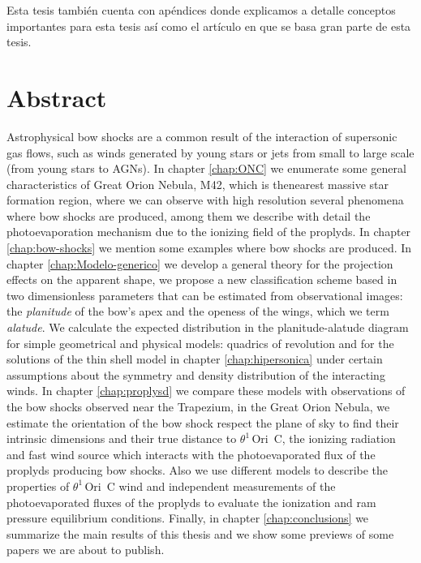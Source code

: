 \documentclass[11pt, twoside]{book}
\newcommand\thC{\(\theta^1\)\,Ori~C} %
\begin{document}
Esta tesis también cuenta con apéndices donde explicamos a detalle conceptos importantes para esta tesis así como el artículo en que se basa gran parte de esta tesis.

\section*{\centering Abstract}

  Astrophysical bow shocks are a common result of the interaction of supersonic gas flows, such as winds generated by young stars or jets from small to large scale (from young stars to AGNs). In chapter \ref{chap:ONC} we enumerate some general characteristics of Great Orion Nebula, M42, which is thenearest massive star formation region, where we can observe with high resolution several phenomena where bow shocks are produced, among them we describe with detail the photoevaporation mechanism due to the ionizing field of the proplyds. In chapter \ref{chap:bow-shocks} we mention some examples where bow shocks are produced. In chapter \ref{chap:Modelo-generico} we develop a general theory for the projection effects on the apparent shape, we propose a new classification scheme based in two dimensionless parameters that can be estimated from observational images: the \textit{planitude} of the bow's apex and the openess of the wings, which we term \textit{alatude}. We calculate the expected distribution in the planitude-alatude diagram for simple geometrical and physical models: quadrics of revolution and for the solutions of the thin shell model in chapter \ref{chap:hipersonica} under certain assumptions about the symmetry and density distribution of the interacting winds. In chapter \ref{chap:proplysd} we compare these models with observations of the bow shocks observed near the Trapezium, in the Great Orion Nebula, we estimate the orientation of the bow shock respect the plane of sky to find their intrinsic dimensions and their true distance to \thC{}, the ionizing radiation and fast wind source which interacts with the photoevaporated flux of the proplyds producing bow shocks. Also we use different models to describe the properties of \thC{} wind and independent measurements of the photoevaporated fluxes of the proplyds to evaluate the ionization and ram pressure equilibrium conditions. Finally, in chapter \ref{chap:conclusions} we summarize the main results of this thesis and we show some previews of some papers we are about to publish.
\end{document}
